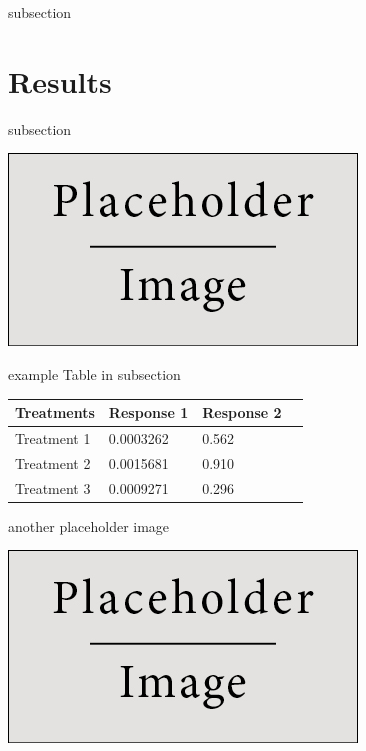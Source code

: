 \documentclass[a0,portrait]{a0poster}
\begin{document}
\begin{multicols}{2}
subsection


\section*{Results}

subsection

\begin{center}\vspace{1cm}
\includegraphics[width=0.8\linewidth]{placeholder}
\end{center}\vspace{1cm}

example Table in subsection

\begin{center}\vspace{1cm}
\begin{tabular}{l l l l}
\toprule
\textbf{Treatments} & \textbf{Response 1} & \textbf{Response 2} \\
\midrule
Treatment 1 & 0.0003262 & 0.562 \\
Treatment 2 & 0.0015681 & 0.910 \\
Treatment 3 & 0.0009271 & 0.296 \\
\bottomrule
\end{tabular}
\end{center}\vspace{1cm}

another placeholder image

\begin{center}\vspace{1cm}
\includegraphics[width=0.8\linewidth]{placeholder}
\end{center}\vspace{1cm}


\end{multicols}
\end{document}
